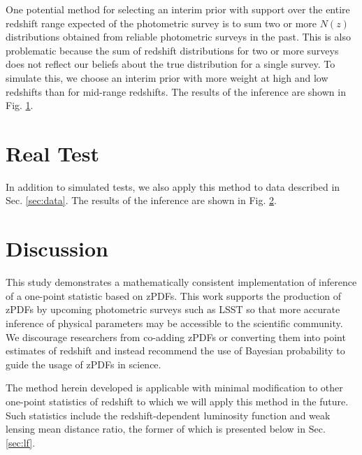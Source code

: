 \documentclass[preprint]{aastex}
\begin{document}
One potential method for selecting an interim prior with support over the 
entire redshift range expected of the photometric survey is to sum two or more 
$N(z)$ distributions obtained from reliable photometric surveys in the past.  
This is also problematic because the sum of redshift distributions for two or 
more surveys does not reflect our beliefs about the true distribution for a 
single survey.  To simulate this, we choose an interim prior with more weight 
at high and low redshifts than for mid-range redshifts.  The results of the 
inference are shown in Fig. \ref{fig:bparam}.

\begin{figure}
\caption{}
\label{fig:bparam}
\end{figure}

\clearpage
\section{Real Test}
\label{sec:boss}

In addition to simulated tests, we also apply this method to data described in 
Sec. \ref{sec:data}.  The results of the inference are shown in Fig. 
\ref{fig:dataparam}.

\begin{figure}
\caption{}
\label{fig:dataparam}
\end{figure}

\clearpage
\section{Discussion}
\label{sec:disc}

This study demonstrates a mathematically consistent implementation of inference 
of a one-point statistic based on zPDFs.  This work supports the production of 
zPDFs by upcoming photometric surveys such as LSST so that more accurate 
inference of physical parameters may be accessible to the scientific community. 
 We discourage researchers from co-adding zPDFs or converting them into point 
estimates of redshift and instead recommend the use of Bayesian probability to 
guide the usage of zPDFs in science.

The method herein developed is applicable with minimal modification to other 
one-point statistics of redshift to which we will apply this method in the 
future.  Such statistics include the redshift-dependent luminosity function and 
weak lensing mean distance ratio, the former of which is presented below in 
Sec. \ref{sec:lf}.
\end{document}
